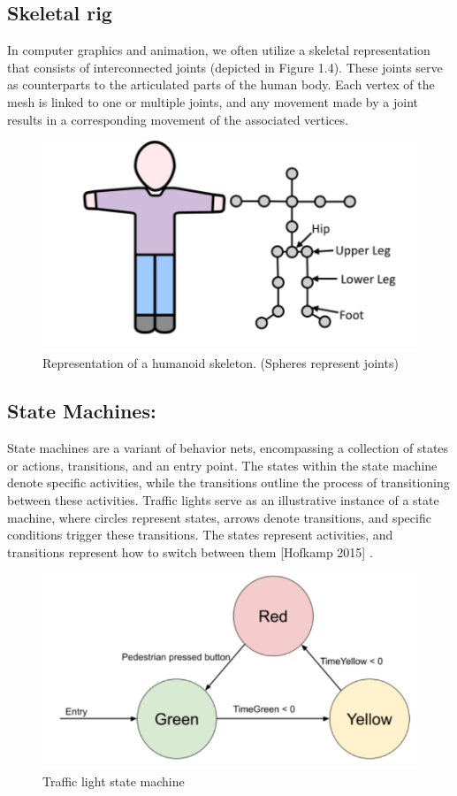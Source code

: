 \documentclass[12pt]{book}
\begin{document}
\subsection{Skeletal rig}
In computer graphics and animation, we often utilize a skeletal representation that consists of interconnected joints (depicted in Figure 1.4).
These joints serve as counterparts to the articulated parts of the human body. Each vertex of the mesh is linked to one or multiple joints, and any movement made by a joint results in a corresponding movement of the associated vertices.
\begin{figure}[!h]
    \centering
    \includegraphics[scale=0.4]{./Figures/Images/Representation of a humanoid skeleton.png}
    \caption{Representation of a humanoid skeleton. (Spheres represent joints)}
    \label{Representation of a humanoid skeleton. (Spheres represent joints)}
\end{figure}

\subsection{State Machines:}
State machines are a variant of behavior nets, encompassing a collection of states or
actions, transitions, and an entry point. The states within the state machine denote specific
activities, while the transitions outline the process of transitioning between these activities.
Traffic lights serve as an illustrative instance of a state machine, where circles represent states,
arrows denote transitions, and specific conditions trigger these transitions. The states represent activities, and transitions represent how to switch between them [Hofkamp 2015] \cite{url-4}.
\begin{figure}[h!]
    \centering
    \includegraphics[scale=0.5]{./Figures/Images/Traffic light state machine.PNG}
    \caption{Traffic light state machine}
    \label{Traffic light state machine}
\end{figure}
\end{document}
